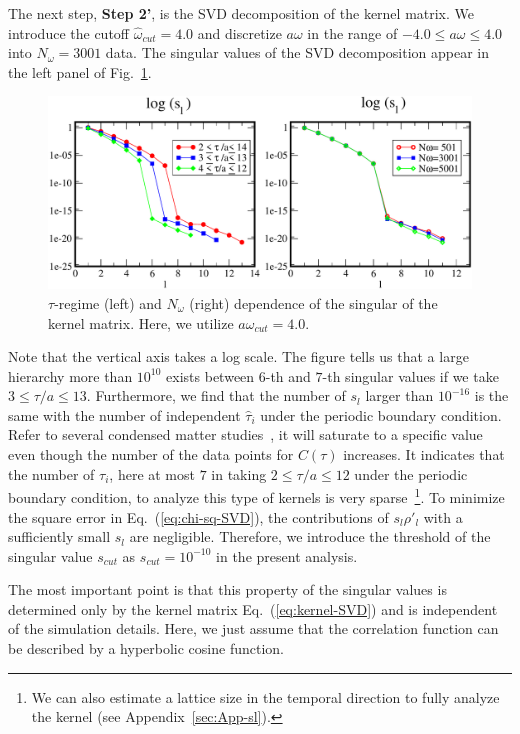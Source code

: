 \documentclass[a4paper,11pt]{article}
\begin{document}
The next step, {\bf Step 2'},  is the SVD decomposition of the kernel matrix.
We introduce the cutoff $\hat{\omega}_{cut}=4.0$ and discretize $a \omega$ in the range of $-4.0 \le a\omega \le 4.0$ into $N_{\omega}=3001$ data.
The singular values of the SVD decomposition appear in the left panel of Fig.~\ref{fig:log-sl-tau-deps}.
\begin{figure}[h]
\begin{center}
\includegraphics[scale=0.5]{./log_sl_l_ft-deps.pdf}
\caption{$\tau$-regime (left) and $N_\omega$ (right) dependence of the singular of the kernel matrix. Here, we utilize $a \omega_{cut}=4.0$.  }
\label{fig:log-sl-tau-deps}
\end{center}
\end{figure}
Note that the vertical axis takes a log scale.
The figure tells us that a large hierarchy more than $10^{10}$ exists between $6$-th and $7$-th singular values if we take $3 \le \tau/a \le 13$. 
Furthermore, we find that the number of $s_l$ larger than $10^{-16}$ is the same with the number of independent $\hat{\tau}_i$ under the periodic boundary condition.
Refer to several condensed matter studies~\cite{Chikano2018a,Chikano2018b,Li2019}, it will saturate to a specific value even though the number of the data points for $C(\tau)$ increases.
It indicates that the number of $\tau_i$, here at most $7$ in taking $2 \le \tau/a \le 12$ under the periodic boundary condition, to analyze this type of kernels is very sparse~\footnote{
We can also estimate a lattice size in the temporal direction to fully analyze the kernel (see Appendix~\ref{sec:App-sl}).}.
To minimize the square error in Eq.~(\ref{eq:chi-sq-SVD}), the contributions of $s_l \rho'_l$ with a sufficiently small $s_l$ are negligible.
Therefore, we introduce the threshold of  the singular value $s_{cut}$ as $s_{cut}=10^{-10}$ in the present analysis.

The most important point is that this property of the singular values is determined only by the kernel matrix Eq.~(\ref{eq:kernel-SVD}) and is independent of the simulation details.
Here, we just assume that the correlation function can be described by a hyperbolic cosine function.
\end{document}
